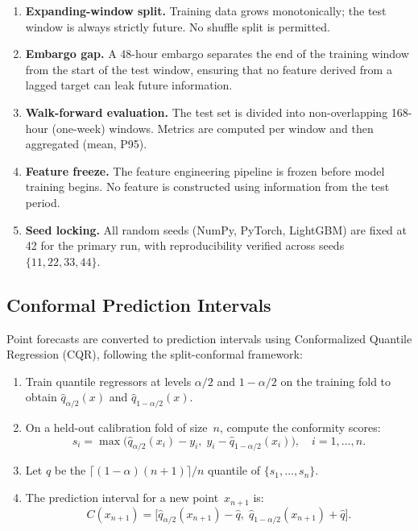 \begin{enumerate}
  \item \textbf{Expanding-window split.}  Training data grows monotonically;
    the test window is always strictly future.  No shuffle split is permitted.
  \item \textbf{Embargo gap.}  A 48-hour embargo separates the end of the
    training window from the start of the test window, ensuring that no
    feature derived from a lagged target can leak future information.
  \item \textbf{Walk-forward evaluation.}  The test set is divided into
    non-overlapping 168-hour (one-week) windows.  Metrics are computed per
    window and then aggregated (mean, P95).
  \item \textbf{Feature freeze.}  The feature engineering pipeline is frozen
    before model training begins.  No feature is constructed using information
    from the test period.
  \item \textbf{Seed locking.}  All random seeds (NumPy, PyTorch, LightGBM)
    are fixed at 42 for the primary run, with reproducibility verified across
    seeds $\{11, 22, 33, 44\}$.
\end{enumerate}

\subsection{Conformal Prediction Intervals}
\label{sec:conformal}

Point forecasts are converted to prediction intervals using Conformalized
Quantile Regression (CQR), following the split-conformal framework:

\begin{enumerate}
  \item Train quantile regressors at levels $\alpha/2$ and $1 - \alpha/2$
    on the training fold to obtain $\hat{q}_{\alpha/2}(x)$ and
    $\hat{q}_{1-\alpha/2}(x)$.
  \item On a held-out calibration fold of size~$n$, compute the conformity
    scores:
    \begin{equation}
    \label{eq:cqr-scores}
      s_i = \max\!\bigl(\hat{q}_{\alpha/2}(x_i) - y_i,\;
                        y_i - \hat{q}_{1-\alpha/2}(x_i)\bigr),
      \quad i = 1, \ldots, n.
    \end{equation}
  \item Let $\hat{q}$ be the $\lceil (1-\alpha)(n+1) \rceil / n$
    quantile of $\{s_1, \ldots, s_n\}$.
  \item The prediction interval for a new point~$x_{n+1}$ is:
    \begin{equation}
    \label{eq:cqr-interval}
      C(x_{n+1}) = \bigl[\hat{q}_{\alpha/2}(x_{n+1}) - \hat{q},\;
                         \hat{q}_{1-\alpha/2}(x_{n+1}) + \hat{q}\bigr].
    \end{equation}
\end{enumerate}

